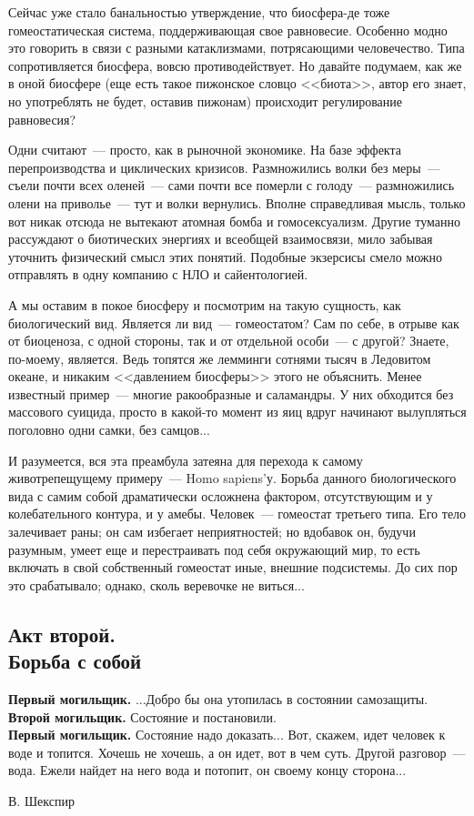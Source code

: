 \documentclass{scrbook}
\makeatletter
\newcommand{\defaultepigraphwidth}{0.5} %
\newcommand{\flqq}{<<}
\newcommand{\frqq}{>>}
\newcommand{\mdash}{~--- }
\newcommand{\essaysection}[1]{\subsection*{#1}\nopagebreak}
\newcommand{\myepigraph}[3][\@empty]{
	\ifx\@empty#1
		\setlength{\epigraphwidth}{\defaultepigraphwidth\textwidth}
	\else
		\setlength{\epigraphwidth}{#1\textwidth}
	\fi
	\epigraph{#2}{#3}
	\setlength{\epigraphwidth}{\defaultepigraphwidth\textwidth} %
	\nopagebreak
}
\makeatother
\begin{document}
Сейчас уже стало банальностью утверждение, что биосфера-де тоже гомеостатическая система, поддерживающая свое равновесие. Особенно модно это говорить в связи с разными катаклизмами, потрясающими человечество. Типа сопротивляется биосфера, вовсю противодействует. Но давайте подумаем, как же в оной биосфере (еще есть такое пижонское словцо {\flqq}биота{\frqq}, автор его знает, но употреблять не будет, оставив пижонам) происходит регулирование равновесия?

Одни считают{\mdash}просто, как в рыночной экономике. На базе эффекта перепроизводства и циклических кризисов. Размножились волки без меры{\mdash}съели почти всех оленей{\mdash}сами почти все померли с голоду{\mdash}размножились олени на приволье{\mdash}тут и волки вернулись. Вполне справедливая мысль, только вот никак отсюда не вытекают атомная бомба и гомосексуализм. Другие туманно рассуждают о биотических энергиях и всеобщей взаимосвязи, мило забывая уточнить физический смысл этих понятий. Подобные экзерсисы смело можно отправлять в одну компанию с НЛО и сайентологией.

А мы оставим в покое биосферу и посмотрим на такую сущность, как биологический вид. Является ли вид{\mdash}гомеостатом? Сам по себе, в отрыве как от биоценоза, с одной стороны, так и от отдельной особи{\mdash}с другой? Знаете, по-моему, является. Ведь топятся же лемминги сотнями тысяч в Ледовитом океане, и никаким {\flqq}давлением биосферы{\frqq} этого не объяснить. Менее известный пример{\mdash}многие ракообразные и саламандры. У них обходится без массового суицида, просто в какой-то момент из яиц вдруг начинают вылупляться поголовно одни самки, без самцов...

И разумеется, вся эта преамбула затеяна для перехода к самому животрепещущему примеру{\mdash}Homo sapiens'у. Борьба данного биологического вида с самим собой драматически осложнена фактором, отсутствующим и у колебательного контура, и у амебы. Человек{\mdash}гомеостат третьего типа. Его тело залечивает раны; он сам избегает неприятностей; но вдобавок он, будучи разумным, умеет еще и перестраивать под себя окружающий мир, то есть включать в свой собственный гомеостат иные, внешние подсистемы. До сих пор это срабатывало; однако, сколь веревочке не виться...

\essaysection{Акт второй. \\ Борьба с собой}

\myepigraph{\textbf{Первый могильщик.} ...Добро бы она утопилась в состоянии самозащиты. \\
\textbf{Второй могильщик.} Состояние и постановили. \\
\textbf{Первый могильщик.} Состояние надо доказать... Вот, скажем, идет человек к воде и топится. Хочешь не хочешь, а он идет, вот в чем суть. Другой разговор{\mdash}вода. Ежели найдет на него вода и потопит, он своему концу сторона...}
{В. Шекспир}
\end{document}
